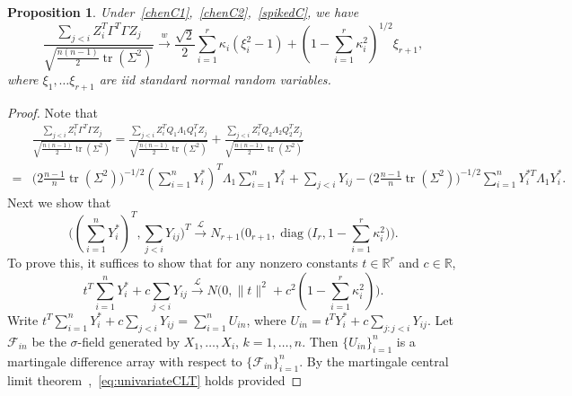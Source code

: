 \documentclass[3p]{elsarticle}
\DeclareMathOperator{\mytr}{tr}
\DeclareMathOperator{\mydiag}{diag}
\theoremstyle{plain}
\newtheorem{proposition}{\quad\quad Proposition}
\theoremstyle{definition}
\theoremstyle{remark}
\begin{document}
\begin{proposition}\label{prop:spiked2}
    Under~\eqref{chenC1},~\eqref{chenC2},~\eqref{spikedC},
    we have
    $$
    \frac{\sum_{j<i} Z_i^T \Gamma^T \Gamma Z_j }
    {\sqrt{\frac{n(n-1)}{2}\mytr(\Sigma^2)}}
    \xrightarrow{w}\frac{\sqrt{2}}{2}\sum_{i=1}^r \kappa_i (\xi_i^2-1)+(1-\sum_{i=1}^r \kappa_i^2)^{1/2} \xi_{r+1},
    $$
    where $\xi_1,\ldots \xi_{r+1}$ are iid standard normal random variables.
\end{proposition}

\begin{proof}
    Note that
    $$
    \begin{aligned}
        &
    \frac{\sum_{j<i} Z_i^T \Gamma^T \Gamma Z_j }
    {\sqrt{\frac{n(n-1)}{2}\mytr(\Sigma^2)}}
        =
        \frac{\sum_{j<i}Z_i^T Q_1 \Lambda_1 Q_1^T Z_j}
    {\sqrt{\frac{n(n-1)}{2}\mytr(\Sigma^2)}}
        +
        \frac{\sum_{j<i}Z_i^T Q_2 \Lambda_2 Q_2^T Z_j}
    {\sqrt{\frac{n(n-1)}{2}\mytr(\Sigma^2)}}
    \\
        =&
        \big(2\frac{n-1}{n}\mytr(\Sigma^2)\big)^{-1/2}(\sum_{i=1}^n  Y_i^*)^T \Lambda_1 \sum_{i=1}^n  Y_i^*
        +
        \sum_{j<i} Y_{ij}
        -
        \big(2\frac{n-1}{n}\mytr(\Sigma^2)\big)^{-1/2}
        \sum_{i=1}^n Y_i^{*T}\Lambda_1 Y_i^*
        .
    \end{aligned}
    $$
    Next we show that 
    \begin{equation}\label{eq:toProveCLT}
        \big(
        (\sum_{i=1}^n Y_i^*)^T,
        \sum_{j<i} Y_{ij}
        \big)^T
    \xrightarrow{\mathcal{L}} N_{r+1}\Big(0_{r+1}, \mydiag \big(I_{r},1-\sum_{i=1}^r \kappa_i^2\big)\Big).
\end{equation}
    To prove this, it suffices to show that for any nonzero constants $t\in\mathbb{R}^r$ and $c\in\mathbb{R}$,
    \begin{equation}\label{eq:univariateCLT}
        t^T \sum_{i=1}^n Y_i^* +c \sum_{j<i} Y_{ij}
        \xrightarrow{\mathcal{L}}N\big(0,\|t\|^2+c^2(1-\sum_{i=1}^r \kappa_i^2)\big).
    \end{equation}
    Write $t^T \sum_{i=1}^n Y_i^*+c \sum_{j<i}Y_{ij} =\sum_{i=1}^n U_{in}$,
    where 
    $U_{in}=
    t^T Y_i^*+c  \sum_{j: j<i}Y_{ij}
    $.
    Let $\mathcal{F}_{in}$ be the $\sigma$-field generated by $X_1,\dots, X_i$, $k=1,\ldots,n$.
    Then $\{U_{in}\}_{i=1}^n$ is a martingale difference array with respect to $\{\mathcal{F}_{in}\}_{i=1}^n$.
    By the martingale central limit theorem~\citep[Chapter VIII, Theorem 1]{pollard1984convergence},~\eqref{eq:univariateCLT} holds provided

\end{proof}
\end{document}
